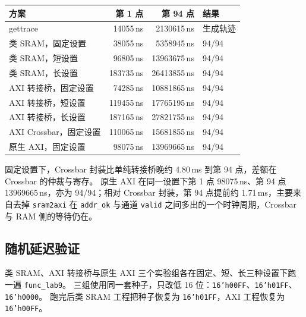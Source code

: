 \documentclass{article}
\begin{document}
\begin{center}
\small
\begin{tabular}{lrrl}
\toprule
方案 & 第 1 点 & 第 94 点 & 结果 \\
\midrule
gettrace & 14055\,ns & 2130615\,ns & 生成轨迹 \\
类 SRAM，固定设置 & 38055\,ns & 5358945\,ns & 94/94 \\
类 SRAM，短设置 & 96805\,ns & 13963675\,ns & 94/94 \\
类 SRAM，长设置 & 183735\,ns & 26413855\,ns & 94/94 \\
AXI 转接桥，固定设置 & 74285\,ns & 10881865\,ns & 94/94 \\
AXI 转接桥，短设置 & 119455\,ns & 17765195\,ns & 94/94 \\
AXI 转接桥，长设置 & 187165\,ns & 27821755\,ns & 94/94 \\
AXI Crossbar，固定设置 & 110065\,ns & 15681855\,ns & 94/94 \\
原生 AXI，固定设置 & 98075\,ns & 13969665\,ns & 94/94 \\
\bottomrule
\end{tabular}
\end{center}

固定设置下，Crossbar 封装比单纯转接桥晚约 4.80\,ms 到第 94 点，差额在 Crossbar 的仲裁与寄存。
原生 AXI 在同一设置下第 1 点 98075\,ns、第 94 点 13969665\,ns，亦为 94/94；相对 Crossbar 封装，第 94 点提前约 1.71\,ms，主要来自去掉 \texttt{sram2axi} 在 \texttt{addr\_ok} 与通道 \texttt{valid} 之间多出的一个时钟周期，Crossbar 与 RAM 侧的等待仍在。

\subsection{随机延迟验证}
类 SRAM、AXI 转接桥与原生 AXI 三个实验组各在固定、短、长三种设置下跑一遍 \texttt{func\_lab9}。
三组使用同一套种子，只改低 16 位：\texttt{16'h00FF}、\texttt{16'h01FF}、\texttt{16'h0000}。
跑完后类 SRAM 工程把种子恢复为 \texttt{16'h01FF}，AXI 工程恢复为 \texttt{16'h00FF}。
\end{document}
